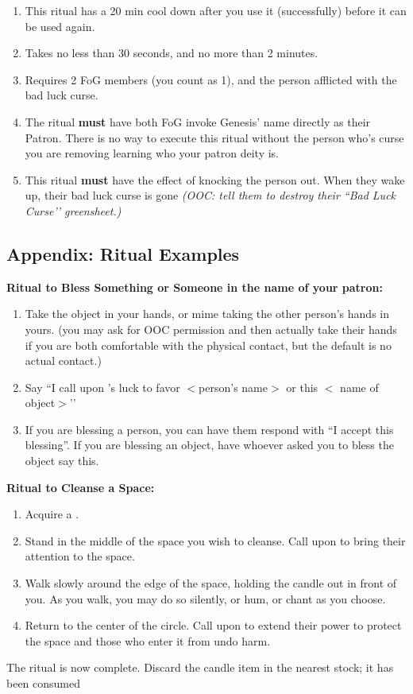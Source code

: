 \documentclass[green]{GL2020}
\begin{document}
\begin{enumerate}
    \item This ritual has a 20 min cool down after you use it (successfully) before it can be used again.
    \item Takes no less than 30 seconds, and no more than 2 minutes.
    \item Requires 2 FoG members (you count as 1), and the person afflicted with the bad luck curse.
    \item The ritual \textbf{must} have both FoG invoke Genesis’ name directly as their Patron. There is no way to execute this ritual without the person who’s curse you are removing learning who your patron deity is.
		\item This ritual \textbf{must} have the effect of knocking the person out. When they wake up, their bad luck curse is gone \emph{(OOC: tell them to destroy their ``Bad Luck Curse’’ greensheet.)}
  \end{enumerate}

\subsection*{Appendix: Ritual Examples}

\textbf{Ritual to Bless Something or Someone in the name of your patron:}
  \begin{enumerate}
    \item Take the object in your hands, or mime taking the other person’s hands in yours. (you may ask for OOC permission and then actually take their hands if you are both comfortable with the physical contact, but the default is no actual contact.)
    \item Say ``I call upon \cGenesis{}’s luck to favor $<$person’s name$>$ or this $<$ name of object$>$’’
    \item If you are blessing a person, you can have them respond with ``I accept this blessing''. If you are blessing an object, have whoever asked you to bless the object say this.
  \end{enumerate}

\textbf{Ritual to Cleanse a Space:}
  \begin{enumerate}
    \item Acquire a \iRitualCandle{}.
    \item Stand in the middle of the space you wish to cleanse. Call upon \cGenesis{} to bring their attention to the space.
    \item Walk slowly around the edge of the space, holding the candle out in front of you. As you walk, you may do so silently, or hum, or chant as you choose.
    \item Return to the center of the circle. Call upon \cGenesis{} to extend their power to protect the space and those who enter it from undo harm.
  \end{enumerate}
The ritual is now complete. Discard the candle item in the nearest stock; it has been consumed
   
\end{document}

